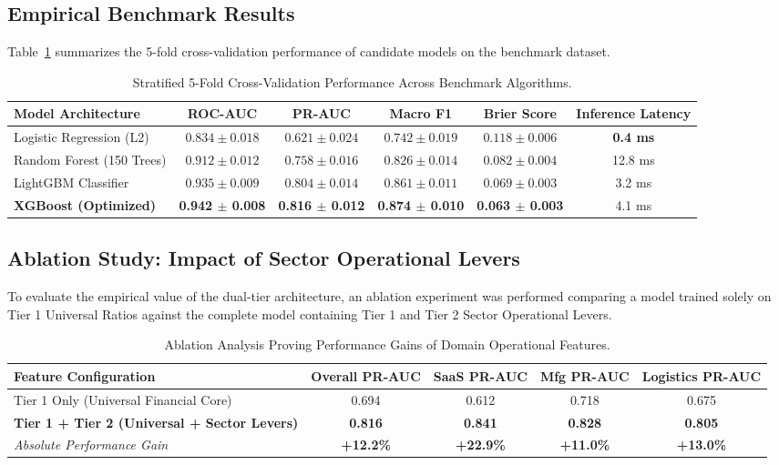 \documentclass[11pt, a4paper]{article}
\begin{document}
\subsection{Empirical Benchmark Results}
Table~\ref{tab:model_benchmarks} summarizes the 5-fold cross-validation performance of candidate models on the benchmark dataset.

\begin{table}[htbp]
\centering
\small
\begin{tabularx}{\textwidth}{lccccc}
\toprule
\textbf{Model Architecture} & \textbf{ROC-AUC} & \textbf{PR-AUC} & \textbf{Macro F1} & \textbf{Brier Score} & \textbf{Inference Latency} \\
\midrule
Logistic Regression (L2) & $0.834 \pm 0.018$ & $0.621 \pm 0.024$ & $0.742 \pm 0.019$ & $0.118 \pm 0.006$ & \textbf{0.4 ms} \\
Random Forest (150 Trees) & $0.912 \pm 0.012$ & $0.758 \pm 0.016$ & $0.826 \pm 0.014$ & $0.082 \pm 0.004$ & 12.8 ms \\
LightGBM Classifier & $0.935 \pm 0.009$ & $0.804 \pm 0.014$ & $0.861 \pm 0.011$ & $0.069 \pm 0.003$ & 3.2 ms \\
\textbf{XGBoost (Optimized)} & \textbf{0.942 $\pm$ 0.008} & \textbf{0.816 $\pm$ 0.012} & \textbf{0.874 $\pm$ 0.010} & \textbf{0.063 $\pm$ 0.003} & 4.1 ms \\
\bottomrule
\end{tabularx}
\caption{Stratified 5-Fold Cross-Validation Performance Across Benchmark Algorithms.}
\label{tab:model_benchmarks}
\end{table}

\subsection{Ablation Study: Impact of Sector Operational Levers}
To evaluate the empirical value of the dual-tier architecture, an ablation experiment was performed comparing a model trained solely on Tier 1 Universal Ratios against the complete model containing Tier 1 and Tier 2 Sector Operational Levers.

\begin{table}[htbp]
\centering
\small
\begin{tabularx}{\textwidth}{lcccc}
\toprule
\textbf{Feature Configuration} & \textbf{Overall PR-AUC} & \textbf{SaaS PR-AUC} & \textbf{Mfg PR-AUC} & \textbf{Logistics PR-AUC} \\
\midrule
Tier 1 Only (Universal Financial Core) & 0.694 & 0.612 & 0.718 & 0.675 \\
\textbf{Tier 1 + Tier 2 (Universal + Sector Levers)} & \textbf{0.816} & \textbf{0.841} & \textbf{0.828} & \textbf{0.805} \\
\midrule
\textit{Absolute Performance Gain} & \textbf{+12.2\%} & \textbf{+22.9\%} & \textbf{+11.0\%} & \textbf{+13.0\%} \\
\bottomrule
\end{tabularx}
\caption{Ablation Analysis Proving Performance Gains of Domain Operational Features.}
\label{tab:ablation}
\end{table}
\end{document}
